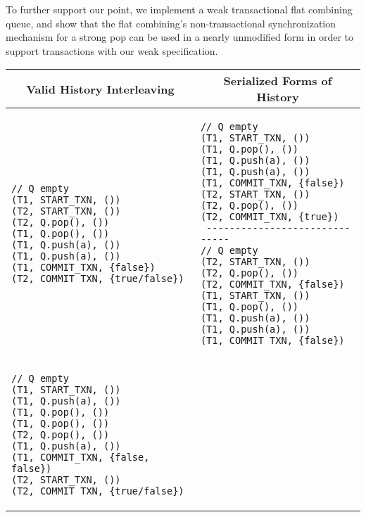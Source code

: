 To further support our point, we implement a weak transactional flat combining queue, and show that the flat combining's non-transactional synchronization mechanism for a strong pop can be used in a nearly unmodified form in order to support transactions with our weak specification.

\begin{table}[H]
    \centering
    \singlespace
    \begin{tabular}{|l|l|}
        \hline
\multicolumn{1}{|c|}{Valid History Interleaving} & \multicolumn{1}{c|}{Serialized Forms of History}\\
        \hline
\begin{lstlisting}
// Q empty
(T1, START_TXN, ())                       
(T2, START_TXN, ())                       
(T2, Q.pop(), ())                       
(T1, Q.pop(), ())                       
(T1, Q.push(a), ())                       
(T1, Q.push(a), ())                       
(T1, COMMIT_TXN, {false})                       
(T2, COMMIT_TXN, {true/false})                       
\end{lstlisting} &
\begin{lstlisting}
// Q empty
(T1, START_TXN, ())                       
(T1, Q.pop(), ())                       
(T1, Q.push(a), ())                       
(T1, Q.push(a), ())                       
(T1, COMMIT_TXN, {false})                       
(T2, START_TXN, ())                       
(T2, Q.pop(), ())                       
(T2, COMMIT_TXN, {true})                       
 ------------------------------
// Q empty
(T2, START_TXN, ())                       
(T2, Q.pop(), ())                       
(T2, COMMIT_TXN, {false})                       
(T1, START_TXN, ())                       
(T1, Q.pop(), ())                       
(T1, Q.push(a), ())                       
(T1, Q.push(a), ())                       
(T1, COMMIT_TXN, {false})                       
\end{lstlisting}\\
\hline
\begin{lstlisting}
// Q empty
(T1, START_TXN, ())                       
(T1, Q.push(a), ())                       
(T1, Q.pop(), ())                       
(T1, Q.pop(), ())                       
(T2, Q.pop(), ())                       
(T1, Q.push(a), ())                       
(T1, COMMIT_TXN, {false, false})                       
(T2, START_TXN, ())                       
(T2, COMMIT_TXN, {true/false})                       
\end{lstlisting} &
\begin{lstlisting}

\end{lstlisting}
\end{tabular}
\end{table}
